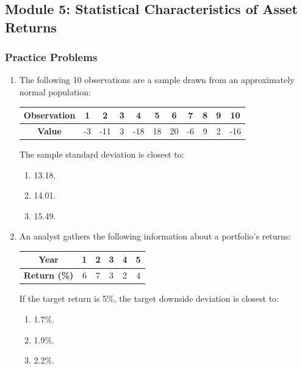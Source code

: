\newpage

\subsection{Module 5: Statistical Characteristics of Asset Returns}
\label{sec:app_Problems_M5}

\subsubsection{Practice Problems}
\label{subsec:app_Problems_M5}

\begin{enumerate}
	\item The following 10 observations are a sample drawn from an approximately normal population:
	      \begin{center}
	      \begin{tabular}{|c|c|c|c|c|c|c|c|c|c|c|}
		      \hline
		      \textbf{Observation} & 1 & 2 & 3 & 4 & 5 & 6 & 7 & 8 & 9 & 10 \\
		      \hline
		      \textbf{Value} & -3 & -11 & 3 & -18 & 18 & 20 & -6 & 9 & 2 & -16 \\
		      \hline
	      \end{tabular}
	      \end{center}
	      The sample standard deviation is closest to:
	      \begin{enumerate}[label=\Alph*.]
		      \item 13.18.
		      \item 14.01.
		      \item 15.49.
	      \end{enumerate}

	\item An analyst gathers the following information about a portfolio's returns:
	      \begin{center}
	      \begin{tabular}{|c|c|c|c|c|c|}
		      \hline
		      \textbf{Year} & 1 & 2 & 3 & 4 & 5 \\
		      \hline
		      \textbf{Return (\%)} & 6 & 7 & 3 & 2 & 4 \\
		      \hline
	      \end{tabular}
	      \end{center}
	      If the target return is 5\%, the target downside deviation is closest to:
	      \begin{enumerate}[label=\Alph*.]
		      \item 1.7\%.
		      \item 1.9\%.
		      \item 2.2\%.
	      \end{enumerate}


\end{enumerate}
